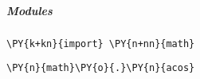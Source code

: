     \subparagraph{Modules}



{\par%
\vspace{-1\baselineskip}%
}%
\begin{notebookcell}[12]%
\begin{addmargin}[\cellleftmargin]{0em}%
{\smaller%
\par%
%
\vspace{-1\smallerfontscale}%
\begin{Verbatim}[commandchars=\\\{\}]
\PY{k+kn}{import} \PY{n+nn}{math}
\end{Verbatim}
%
\par%
\vspace{-1\smallerfontscale}}%
\end{addmargin}
\end{notebookcell}



{\par%
\vspace{-1\baselineskip}%
}%
\begin{notebookcell}[14]%
\begin{addmargin}[\cellleftmargin]{0em}%
{\smaller%
\par%
%
\vspace{-1\smallerfontscale}%
\begin{Verbatim}[commandchars=\\\{\}]
\PY{n}{math}\PY{o}{.}\PY{n}{acos}
\end{Verbatim}
%
\par%
\vspace{-1\smallerfontscale}}%
\end{addmargin}
\end{notebookcell}

\par\vspace{1\smallerfontscale}%
    
